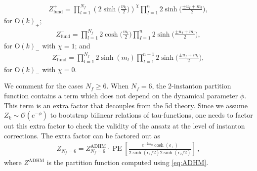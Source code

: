 \documentclass[11pt, a4paper]{article}
\DeclareMathOperator{\PE}{PE}
\theoremstyle{definition}
\begin{document}
\begin{align}
    Z_{\mathrm{fund}}^+ = \prod_{l=1}^{N_f} \left( 2\sinh\Big(\frac{m_l}{2}\Big) \right)^\chi \prod_{I=1}^n 2\sinh\Big(\frac{\pm u_I+m_l}{2}\Big) ,
\end{align}
for $ \mathrm{O}(k)_+ $;
\begin{align}
    Z_{\mathrm{fund}}^- = \prod_{l=1}^{N_f} 2\cosh\Big(\frac{m_l}{2}\Big) \prod_{I=1}^n 2\sinh\Big(\frac{\pm u_I+m_l}{2}\Big) ,
\end{align}
for $ \mathrm{O}(k)_- $ with $ \chi=1 $; and
\begin{align}
    Z_{\mathrm{fund}}^- = \prod_{l=1}^{N_f} 2\sinh(m_l) \prod_{I=1}^{n-1} 2\sinh\Big(\frac{\pm u_I+m_l}{2}\Big) ,
\end{align}
for $ \mathrm{O}(k)_- $ with $ \chi=0 $.

We comment for the cases $ N_f \geq 6 $. When $ N_f=6 $, the 2-instanton partition function contains a term which does not depend on the dynamical parameter $ \phi $. This term is an extra factor that decouples from the 5d theory. Since we assume $ Z_k \sim \mathcal{O}(e^{-\phi}) $ to bootstrap bilinear relations of tau-functions, one needs to factor out this extra factor to check the validity of the ansatz at the level of instanton corrections. The extra factor can be factored out as
\begin{align}
    Z_{N_f=6} = Z_{N_f=6}^{\mathrm{ADHM}} \cdot \PE\left[ \frac{e^{-2m_0} \cosh(\epsilon_+)}{2\sinh(\epsilon_1/2) 2\sinh(\epsilon_2/2)} \right] \, ,
\end{align}
where $ Z^{\mathrm{ADHM}} $ is the partition function computed using \eqref{eq:ADHM}.
\end{document}
